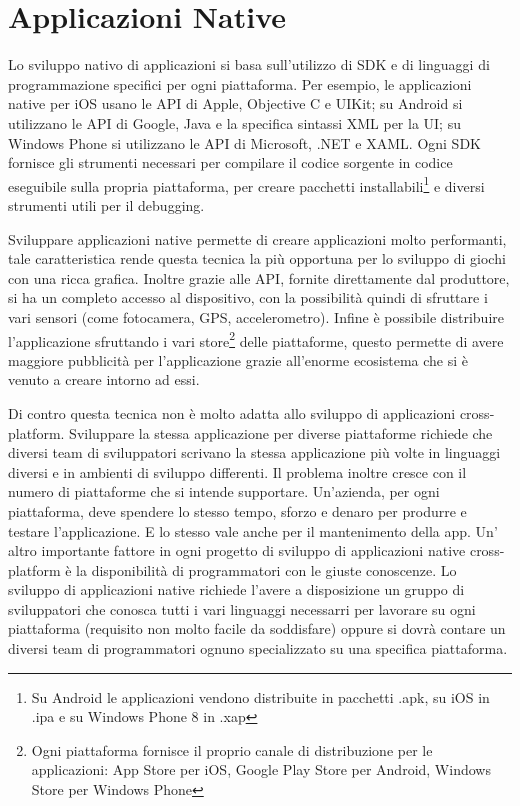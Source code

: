 	\section{Applicazioni Native}
		Lo sviluppo nativo di applicazioni si basa sull'utilizzo di SDK e di 
		linguaggi di programmazione specifici per ogni piattaforma. Per esempio, 
		le applicazioni native per iOS usano le API di Apple, Objective C e 
		UIKit; su Android si utilizzano le API di Google, Java e la specifica 
		sintassi XML per la UI; su Windows Phone si utilizzano le API di 
		Microsoft, .NET e XAML. Ogni SDK fornisce gli strumenti necessari per 
		compilare il codice sorgente in codice eseguibile sulla propria 
		piattaforma, per creare pacchetti installabili\footnote{Su Android le 
		applicazioni vendono distribuite in pacchetti .apk, su iOS in .ipa e su 
		Windows Phone 8 in .xap} e diversi strumenti utili per il debugging.

		Sviluppare applicazioni native permette di creare applicazioni molto 
		performanti, tale caratteristica rende questa tecnica la più opportuna 
		per lo sviluppo di giochi con una ricca grafica. Inoltre grazie alle 
		API, fornite direttamente dal produttore, si ha un completo accesso al 
		dispositivo, con la possibilità quindi di sfruttare i vari sensori 
		(come fotocamera, GPS, accelerometro). Infine è possibile distribuire 
		l'applicazione sfruttando i vari store\footnote{Ogni piattaforma 
		fornisce il proprio canale di distribuzione per le applicazioni: 
		App Store per iOS, Google Play Store per Android, Windows Store per 
		Windows Phone} delle piattaforme, questo permette di avere maggiore 
		pubblicità per l'applicazione grazie all'enorme ecosistema che si è 
		venuto a creare intorno ad essi.

		Di contro questa tecnica non è molto adatta allo sviluppo di 
		applicazioni cross-platform. Sviluppare la stessa applicazione per 
		diverse piattaforme richiede che diversi team di sviluppatori scrivano 
		la stessa applicazione più volte in linguaggi diversi e in ambienti di 
		sviluppo differenti. Il problema inoltre cresce con il numero di 
		piattaforme che si intende supportare. Un'azienda, per ogni piattaforma, 
		deve spendere lo stesso tempo, sforzo e denaro per produrre e testare 
		l'applicazione. E lo stesso vale anche per il mantenimento della app. 
		Un' altro importante fattore in ogni progetto di sviluppo di 
		applicazioni native cross-platform è la disponibilità di programmatori 
		con le giuste conoscenze. Lo sviluppo di applicazioni native richiede 
		l'avere a disposizione un gruppo di sviluppatori che conosca tutti i 
		vari linguaggi necessarri per lavorare su ogni piattaforma (requisito 
		non	molto facile da soddisfare) oppure si dovrà contare un diversi team 
		di programmatori ognuno specializzato su una specifica piattaforma.
		
